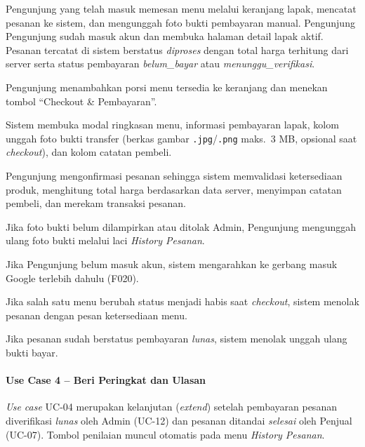{Pengunjung yang telah masuk memesan menu melalui keranjang lapak, mencatat pesanan ke sistem, dan mengunggah foto bukti pembayaran manual.}
{Pengunjung}
{Pengunjung sudah masuk akun dan membuka halaman detail lapak aktif.}
{Pesanan tercatat di sistem berstatus \textit{diproses} dengan total harga terhitung dari server serta status pembayaran \textit{belum\_bayar} atau \textit{menunggu\_verifikasi}.}
{\begin{uclist}
  \item Pengunjung menambahkan porsi menu tersedia ke keranjang dan menekan tombol ``Checkout \& Pembayaran''.
  \item Sistem membuka modal ringkasan menu, informasi pembayaran lapak, kolom unggah foto bukti transfer (berkas gambar \texttt{.jpg}/\texttt{.png} maks.\ 3 MB, opsional saat \textit{checkout}), dan kolom catatan pembeli.
  \item Pengunjung mengonfirmasi pesanan sehingga sistem memvalidasi ketersediaan produk, menghitung total harga berdasarkan data server, menyimpan catatan pembeli, dan merekam transaksi pesanan.
  \item Jika foto bukti belum dilampirkan atau ditolak Admin, Pengunjung mengunggah ulang foto bukti melalui laci \textit{History Pesanan}.
\end{uclist}}
{\begin{ucbullet}
  \item Jika Pengunjung belum masuk akun, sistem mengarahkan ke gerbang masuk Google terlebih dahulu (F020).
  \item Jika salah satu menu berubah status menjadi habis saat \textit{checkout}, sistem menolak pesanan dengan pesan ketersediaan menu.
  \item Jika pesanan sudah berstatus pembayaran \textit{lunas}, sistem menolak unggah ulang bukti bayar.
\end{ucbullet}}

\paragraph{Use Case 4 -- Beri Peringkat dan Ulasan}
\textit{Use case} UC-04 merupakan kelanjutan (\textit{extend}) setelah pembayaran pesanan diverifikasi \textit{lunas} oleh Admin (UC-12) dan pesanan ditandai \textit{selesai} oleh Penjual (UC-07). Tombol penilaian muncul otomatis pada menu \textit{History Pesanan}.

